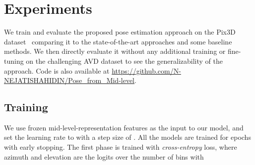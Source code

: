 \documentclass[letterpaper, 10 pt, conference]{ieeeconf}  \pdfoutput=1
\begin{document}
\begin{table*}
\centering
\vspace{6pt}
\caption{The azimuth classification accuracy for  bins with  overlap. Models are all trained category agnostic. }
\label{category_level}
\end{table*}
\section{Experiments}
We train and evaluate the proposed pose estimation approach on the Pix3D dataset~\cite{pix3d} comparing it to the state-of-the-art approaches \cite{pix3d,mousavian20173d} and some baseline methods. We then directly evaluate it without any additional training or fine-tuning on the challenging AVD dataset\cite{Ammirato2017ADF} to see the generalizability of the approach. Code is also available at \url{https://github.com/N-NEJATISHAHIDIN/Pose_from_Mid-level}.





\subsection{Training} 
We use frozen mid-level-representation features as the input to our model,
and set the learning rate to  with a step size of . All the models are trained for  epochs with early stopping. The first phase is trained with {\em cross-entropy} loss, where azimuth  and elevation  are the logits over the number of bins with 
\end{document}
